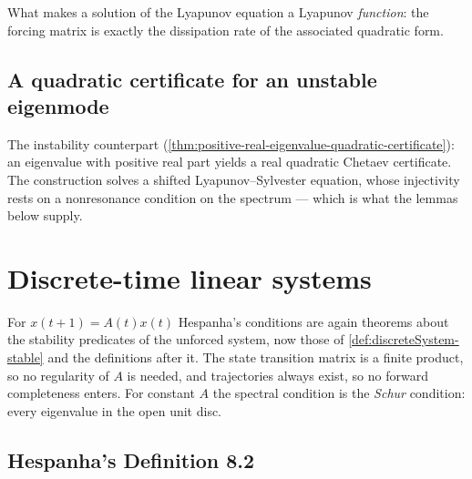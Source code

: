 What makes a solution of the Lyapunov equation a Lyapunov \emph{function}: the forcing matrix
is exactly the dissipation rate of the associated quadratic form.



\subsection{A quadratic certificate for an unstable eigenmode}

The instability counterpart (\cref{thm:positive-real-eigenvalue-quadratic-certificate}): an
eigenvalue with positive real part yields a real quadratic Chetaev certificate. The
construction solves a shifted Lyapunov--Sylvester equation, whose injectivity rests on a
nonresonance condition on the spectrum --- which is what the lemmas below supply.








\section{Discrete-time linear systems}

For $x(t+1) = A(t)x(t)$ Hespanha's conditions are again theorems about the stability predicates
of the unforced system, now those of \cref{def:discreteSystem-stable} and the definitions after
it.  The state transition matrix is a finite product, so no regularity of $A$ is needed, and
trajectories always exist, so no forward completeness enters.  For constant $A$ the spectral
condition is the \emph{Schur} condition: every eigenvalue in the open unit disc.

\subsection{Hespanha's Definition 8.2}

